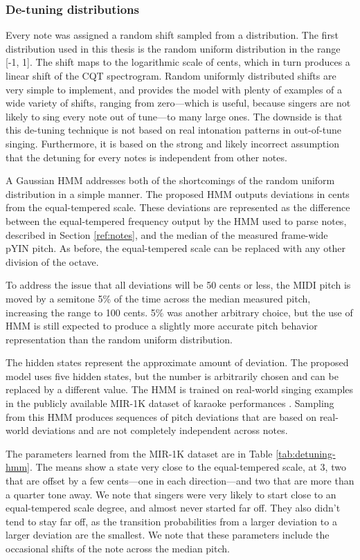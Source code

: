 \subsubsection{De-tuning distributions}
Every note was assigned a random shift sampled from a distribution. The first distribution used in this thesis is the random uniform distribution in the range [-1, 1]. The shift maps to the logarithmic scale of cents, which in turn produces a linear shift of the CQT spectrogram. Random uniformly distributed shifts are very simple to implement, and provides the model with plenty of examples of a wide variety of shifts, ranging from zero---which is useful, because singers are not likely to sing every note out of tune---to many large ones. The downside is that this de-tuning technique is not based on real intonation patterns in out-of-tune singing. Furthermore, it is based on the strong and likely incorrect assumption that the detuning for every notes is independent from other notes.

A Gaussian HMM addresses both of the shortcomings of the random uniform distribution in a simple manner. The proposed HMM outputs deviations in cents from the equal-tempered scale. These deviations are represented as the difference between the equal-tempered frequency output by the HMM used to parse notes, described in Section \ref{ref:notes}, and the median of the measured frame-wide pYIN pitch. As before, the equal-tempered scale can be replaced with any other division of the octave. 

To address the issue that all deviations will be 50 cents or less, the MIDI pitch is moved by a semitone 5\% of the time across the median measured pitch, increasing the range to 100 cents. 5\% was another arbitrary choice, but the use of HMM is still expected to produce a slightly more accurate pitch behavior representation than the random uniform distribution.

The hidden states represent the approximate amount of deviation. The proposed model uses five hidden states, but the number is arbitrarily chosen and can be replaced by a different value. The HMM is trained on real-world singing examples in the publicly available MIR-1K dataset of karaoke performances \cite{su2009improvement}. Sampling from this HMM produces sequences of pitch deviations that are based on real-world deviations and are not completely independent across notes.

The parameters learned from the MIR-1K dataset are in Table \ref{tab:detuning-hmm}. The means show a state very close to the equal-tempered scale, at 3, two that are offset by a few cents---one in each direction---and two that are more than a quarter tone away. We note that singers were very likely to start close to an equal-tempered scale degree, and almost never started far off. They also didn't tend to stay far off, as the transition probabilities from a larger deviation to a larger deviation are the smallest. We note that these parameters include the occasional shifts of the note across the median pitch.

